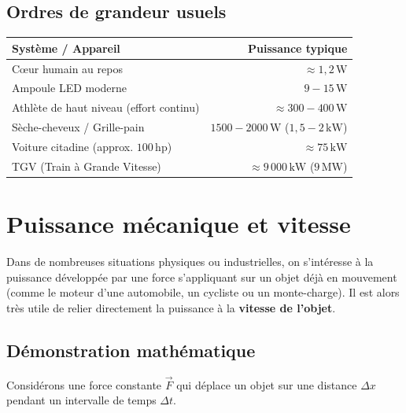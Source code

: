 \documentclass[11pt,openany]{book}
\begin{document}
\subsection*{Ordres de grandeur usuels}

\begin{center}
\renewcommand{\arraystretch}{1.3}
\begin{tabular}{|l|r|}
\hline
\textbf{Système / Appareil} & \textbf{Puissance typique} \\ \hline
Cœur humain au repos & $\approx 1{,}2\,\mathrm{W}$ \\ \hline
Ampoule LED moderne & $9 - 15\,\mathrm{W}$ \\ \hline
Athlète de haut niveau (effort continu) & $\approx 300 - 400\,\mathrm{W}$ \\ \hline
Sèche-cheveux / Grille-pain & $1500 - 2000\,\mathrm{W}$ ($1{,}5 - 2\,\mathrm{kW}$) \\ \hline
Voiture citadine (approx. $100\,\mathrm{hp}$) & $\approx 75\,\mathrm{kW}$ \\ \hline
TGV (Train à Grande Vitesse) & $\approx 9\,000\,\mathrm{kW}$ ($9\,\mathrm{MW}$) \\ \hline
\end{tabular}
\end{center}

\section{Puissance mécanique et vitesse}

Dans de nombreuses situations physiques ou industrielles, on s'intéresse à la puissance développée par une force s'appliquant sur un objet déjà en mouvement (comme le moteur d'une automobile, un cycliste ou un monte-charge). Il est alors très utile de relier directement la puissance à la \textbf{vitesse de l'objet}.

\subsection*{Démonstration mathématique}

Considérons une force constante $\vec{F}$ qui déplace un objet sur une distance $\Delta x$ pendant un intervalle de temps $\Delta t$.
\end{document}
